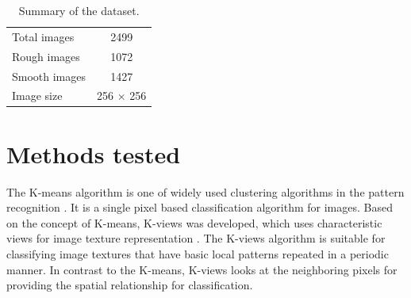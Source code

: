 \documentclass{aci}
\numberwithin{equation}{section}
\begin{document}
\begin{table}[h]
    \centering
    \caption{Summary of the dataset.}
    \begin{tabular}{|l|c|}
        \toprule
        Total images  & 2499             \\
        Rough images  & 1072             \\
        Smooth images & 1427             \\
        Image size    & 256 $\times$ 256 \\
        \bottomrule
    \end{tabular}
    \label{tab:dataset-summary}
\end{table}

\section{Methods tested}


The K-means algorithm is one of widely used clustering algorithms in the pattern
recognition \cite{lloyd_least_1982}. It is a single pixel based classification
algorithm for images. Based on the concept of K-means, K-views was developed,
which uses characteristic views for image texture representation
\cite{hung_use_2002}. The K-views algorithm is suitable for classifying image
textures that have basic local patterns repeated in a periodic manner. In
contrast to the K-means, K-views looks at the neighboring pixels for providing
the spatial relationship for classification.
\end{document}
